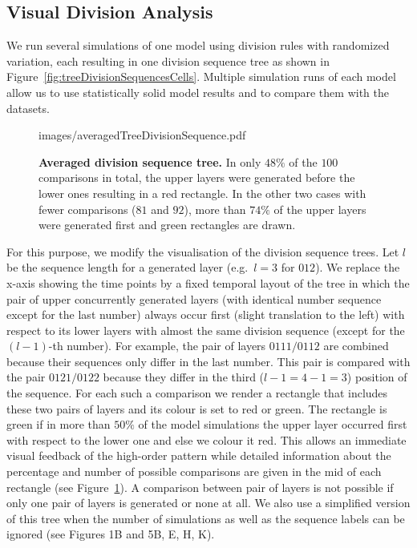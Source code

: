 \documentclass[11pt,a4paper, final]{article}
\begin{document}
\subsection{Visual Division Analysis}
\label{sec:visualAnalysis}
\noindent
We run several simulations of one model using division rules with randomized variation, each resulting in one division sequence tree as shown in Figure~\ref{fig:treeDivisionSequencesCells}. Multiple simulation runs of each model allow us to use statistically solid model results and to compare them with the datasets.
%
\begin{figure}[htbp]
	\begin{center}
		\begin{overpic}[width=0.4\linewidth]{images/averagedTreeDivisionSequence.pdf}
		\end{overpic}
\caption[]
{
{\bf Averaged division sequence tree.} In only $48 \%$ of the $100$ comparisons in total, the upper layers were generated before the lower ones resulting in a red rectangle. In the other two cases with fewer comparisons ($81$ and $92$), more than $74 \%$ of the upper layers were generated first and green rectangles are drawn.
}
	\label{fig:averagedTreeDivisionSequence}
	\end{center}
\end{figure}
%
For this purpose, we modify the visualisation of the division sequence trees. Let $l$ be the sequence length for a generated layer (e.g.\ $l=3$ for $012$). We replace the x-axis showing the time points by a fixed temporal layout of the tree in which the pair of upper concurrently generated layers (with identical number sequence except for the last number) always occur first (slight translation to the left) with respect to its lower layers with almost the same division sequence (except for the $(l-1)$-th number). For example, the pair of layers $0111/0112$ are combined because their sequences only differ in the last number. This pair is compared with the pair $0121/0122$ because they differ in the third ($l-1 = 4-1 = 3$) position of the sequence. For each such a comparison we render a rectangle that includes these two pairs of layers and its colour is set to red or green. The rectangle is green if in more than $50 \%$ of the model simulations the upper layer occurred first with respect to the lower one and else we colour it red. This allows an immediate visual feedback of the high-order pattern while detailed information about the percentage and number of possible comparisons are given in the mid of each rectangle (see Figure~\ref{fig:averagedTreeDivisionSequence}). A comparison between pair of layers is not possible if only one pair of layers is generated or none at all. We also use a simplified version of this tree when the number of simulations as well as the sequence labels can be ignored (see Figures 1B and 5B, E, H, K).
\end{document}

